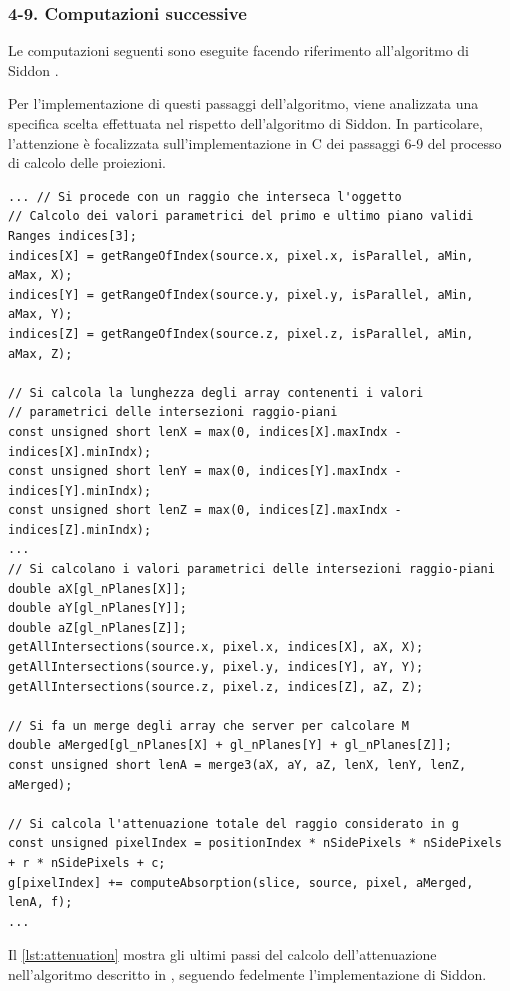 \documentclass[12pt,a4paper]{report}
\begin{document}
\subsubsection{4-9. Computazioni successive}

Le computazioni seguenti sono eseguite facendo riferimento all'algoritmo di Siddon \cite{Siddon1984}.

Per l'implementazione di questi passaggi dell'algoritmo, viene analizzata una specifica scelta effettuata nel rispetto
dell'algoritmo di Siddon.
In particolare, l'attenzione è focalizzata sull'implementazione in C dei passaggi 6-9 del processo di calcolo delle proiezioni.

\begin{lstlisting}[language=CStyle, caption={Codice C per il calcolo dell'attenuazione.}, label={lst:attenuation}]
... // Si procede con un raggio che interseca l'oggetto
// Calcolo dei valori parametrici del primo e ultimo piano validi
Ranges indices[3];
indices[X] = getRangeOfIndex(source.x, pixel.x, isParallel, aMin, aMax, X);
indices[Y] = getRangeOfIndex(source.y, pixel.y, isParallel, aMin, aMax, Y);
indices[Z] = getRangeOfIndex(source.z, pixel.z, isParallel, aMin, aMax, Z);

// Si calcola la lunghezza degli array contenenti i valori
// parametrici delle intersezioni raggio-piani
const unsigned short lenX = max(0, indices[X].maxIndx - indices[X].minIndx);
const unsigned short lenY = max(0, indices[Y].maxIndx - indices[Y].minIndx);
const unsigned short lenZ = max(0, indices[Z].maxIndx - indices[Z].minIndx);
...
// Si calcolano i valori parametrici delle intersezioni raggio-piani
double aX[gl_nPlanes[X]];
double aY[gl_nPlanes[Y]];
double aZ[gl_nPlanes[Z]];
getAllIntersections(source.x, pixel.x, indices[X], aX, X);
getAllIntersections(source.y, pixel.y, indices[Y], aY, Y);
getAllIntersections(source.z, pixel.z, indices[Z], aZ, Z);

// Si fa un merge degli array che server per calcolare M
double aMerged[gl_nPlanes[X] + gl_nPlanes[Y] + gl_nPlanes[Z]];
const unsigned short lenA = merge3(aX, aY, aZ, lenX, lenY, lenZ, aMerged);

// Si calcola l'attenuazione totale del raggio considerato in g
const unsigned pixelIndex = positionIndex * nSidePixels * nSidePixels + r * nSidePixels + c;
g[pixelIndex] += computeAbsorption(slice, source, pixel, aMerged, lenA, f);
...
\end{lstlisting}

Il \autoref{lst:attenuation} mostra gli ultimi passi del calcolo dell'attenuazione nell'algoritmo descritto in
\cite{Colletta2024}, seguendo fedelmente l'implementazione di Siddon.
\end{document}
